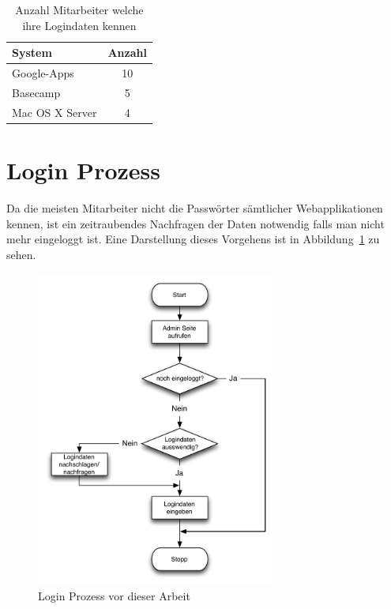 \begin{table}
  \centering
  \begin{tabular}
  	{|l | c|} \hline System & Anzahl\\
  	\hline Google-Apps & 10\\
  	\hline Basecamp & 5\\
  	\hline Mac OS X Server & 4\\
  	\hline 
  \end{tabular}
  \label{tab:umfrage_passworter}
  \caption{Anzahl Mitarbeiter welche ihre Logindaten kennen}
\end{table}

\section{Login Prozess}
\label{sec:Login Prozess}
Da die meisten Mitarbeiter nicht die Passwörter sämtlicher Webapplikationen kennen, ist ein zeitraubendes Nachfragen der Daten notwendig falls man nicht mehr eingeloggt ist. Eine Darstellung dieses Vorgehens ist in Abbildung~\ref{fig:login-before} zu sehen.

\begin{figure}
		\includegraphics[width=0.70\textwidth]{include/login_before.pdf}
		\caption{Login Prozess vor dieser Arbeit}
		\label{fig:login-before}
\end{figure}
